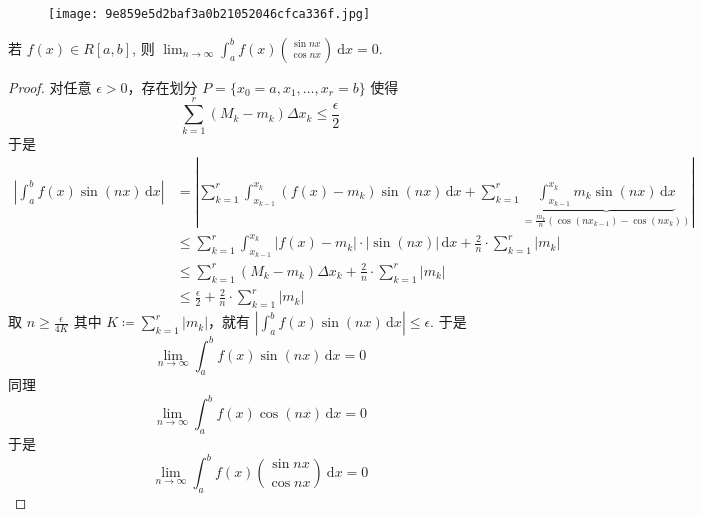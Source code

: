 \begin{figure}[H]
\centering
\texttt{[image: 9e859e5d2baf3a0b21052046cfca336f.jpg]}
\label{}
\end{figure}

\begin{exercise}
若 $f(x) \in R[a, b]$, 则 $\lim _{n \rightarrow \infty} \int_a^b f(x)\binom{\sin n x}{\cos n x} \mathrm{~d} x=0$.
\end{exercise}
\begin{proof}
对任意 $\epsilon>0$，存在划分 $P=\{ x_0=a,x_1,\dots,x_r=b \}$ 使得
\[
\sum_{k=1}^{r} (M_k-m_k)\Delta x_k\leq \frac{\epsilon}{2}
\]
于是
\[
\begin{aligned}
\left\lvert  \int_{a}^{b} f(x)\sin (nx) \, \mathrm{d}x   \right\rvert  & =\left\lvert  \sum_{k=1}^{r} \int_{x_{k-1}}^{x_k} (f(x)-m_k)\sin (nx) \, \mathrm{d}x +\sum_{k=1}^{r} \underbrace{ \int_{x_{k-1}}^{x_k} m_k\sin (nx) \, \mathrm{d}x }_{ =\frac{m_k}{n}(\cos(nx_{k-1})-\cos(nx_k))   }    \right\rvert \\
 & \leq \sum_{k=1}^{r} \int_{x_{k-1}}^{x_k} \lvert f(x)-m_k \rvert \cdot \lvert \sin(nx) \rvert   \, \mathrm{d}x +\frac{2}{n}\cdot\sum_{k=1}^{r} \lvert m_k \rvert   \\
 & \leq \sum_{k=1}^{r} (M_k-m_k)\Delta x_k+\frac{2}{n}\cdot\sum_{k=1}^{r} \lvert m_k \rvert \\
 & \leq \frac{\epsilon}{2}+\frac{2}{n}\cdot\sum_{k=1}^{r} \lvert m_k \rvert
\end{aligned}
\]
取 $n\geq\frac{\epsilon}{4K}$ 其中 $K\coloneqq \sum_{k=1}^{r}\lvert m_k \rvert$，就有 $\left\lvert  \int_{a}^{b} f(x)\sin(nx) \, \mathrm{d}x  \right\rvert\leq\epsilon$. 于是
\[
\lim_{ n \to \infty } \int_{a}^{b} f(x)\sin(nx) \, \mathrm{d}x =0
\]
同理
\[
\lim_{ n \to \infty } \int_{a}^{b} f(x)\cos(nx) \, \mathrm{d}x =0
\]
于是
\[
\lim _{n \rightarrow \infty} \int_a^b f(x)\binom{\sin n x}{\cos n x} \mathrm{~d} x=0
\]
\end{proof}

